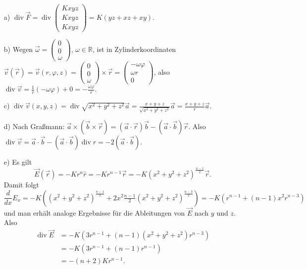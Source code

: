 \documentclass[11pt]{article}
\theoremstyle{plain}
\theoremstyle{definition}
\theoremstyle{remark}
\newcommand{\R}{\mathbb{R}}
\newcommand{\ph}{\varphi}
\renewcommand{\div}{\operatorname{div}}
\begin{document}
\begin{itemize}
\item[a)] 
$ \div \vec{F} 
= \div 
	\begin{pmatrix} Kxyz \\ Kxyz \\ Kxyz \end{pmatrix} 
= K( yz + xz + xy ). $ 

\item[b)] 
Wegen $ \vec{\omega} = \begin{pmatrix} 0 \\ 0 \\ \omega \end{pmatrix} $, 
$ \omega \in \R $, ist in Zylinderkoordinaten $ \vec{v} (\vec{r}) = \vec v (r,\ph,z)
= \begin{pmatrix} 0 \\ 0 \\ \omega \end{pmatrix} \times \vec{r} 
= \begin{pmatrix} - \omega \ph \\ \omega r \\ 0 \end{pmatrix} $, also 
$ \div \vec v 
= \frac{1}{r} (- \omega \ph) +0 = - \frac{\omega \ph}{r}. $ 

\item[c)] 
$ \div \vec{v} (x,y,z) 
= \div \sqrt{x^2+y^2+z^2} \vec{a} 
= \frac{x+y+z}{\sqrt{x^2+y^2+z^2}} \vec{a} 
= \frac{x+y+z}{r} \vec{a}. $ 

\item[d)] 
Nach Graßmann: $ \vec a \times (\vec b \times \vec r) = (\vec a \cdot \vec r) \vec b - (\vec a \cdot \vec b) \vec r $. 
Also $ \div \vec{v} 
= \vec a \cdot \vec b - (\vec a \cdot \vec b) \div r = -2 (\vec a \cdot \vec b). $ 

\item[e)]
Es gilt 
\[ \vec E(\vec r) = -Kr^n\hat r = -Kr^{n-1}\vec r = -K (x^2 + y^2 + z^2)^{\frac{n-1}{2}} \vec r. \]
Damit folgt
\[ \frac{d}{dx} E_x = -K\left((x^2 + y^2 + z^2)^\frac{n-1}{2} + 2x^2\tfrac{n-1}{2} (x^2 + y^2 + z^2)^\frac{n-3}{2} \right) = -K(r^{n-1} + (n-1)x^2 r^{n-3})\]
und man erhält analoge Ergebnisse für die Ableitungen von $\vec E$ nach $y$ und $z$. Also
\begin{align*}
 \div \vec E &= -K \left(3r^{n-1} + (n-1)(x^2 + y^2 + z^2) r^{n-3} \right) \\
&= -K \left(3r^{n-1} + (n-1) r^{n-1} \right) \\
&= -(n+2)Kr^{n-1}.
\end{align*}

\end{itemize}
\end{document}
